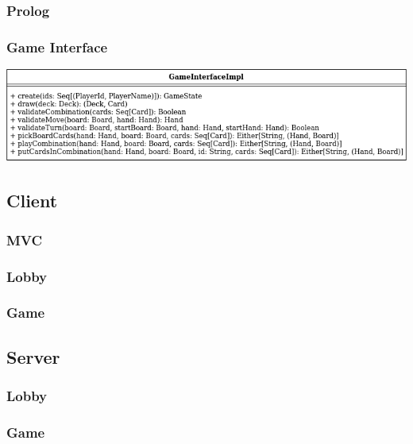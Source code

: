 \documentclass{article}
\begin{document}
    \subsubsection{Prolog}

    \subsubsection{Game Interface}
    \begin{center}
        \includegraphics[scale=0.5]{classi-Page-2.png}
    \end{center}

    \subsection{Client}

    \subsubsection{MVC}

    \subsubsection{Lobby}

    \subsubsection{Game}

    \subsection{Server}

    \subsubsection{Lobby}

    \subsubsection{Game}

    \newpage
\end{document}
